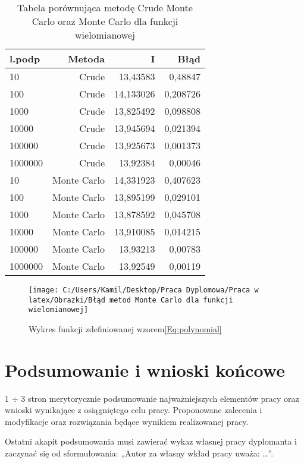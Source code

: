 \documentclass[12pt,twoside]{article}
\begin{document}
\begin{table}
\centering 
\caption{Tabela porównująca metodę Crude Monte Carlo oraz Monte Carlo dla funkcji wielomianowej}
\label{tabela9.7}
\begin{tabular}{lrrr}
\toprule
{l.podp} & Metoda &  I &  Błąd \\
\midrule
10  &     Crude & 13,43583  &   0,48847 \\
100  &     Crude & 14,133026 &   0,208726 \\
1000  &    Crude & 13,825492  &   0,098808  \\
10000  &    Crude & 13,945694  &   0,021394  \\
100000  &    Crude & 13,925673 &    0,001373   \\
1000000  &    Crude & 13,92384 &    0,00046   \\

10  &     Monte Carlo & 14,331923  &   0,407623 \\
100  &     Monte Carlo & 13,895199 &   0,029101\\
1000  &    Monte Carlo & 13,878592   &   0,045708  \\
10000  &    Monte Carlo & 13,910085  &   0,014215  \\
100000  &    Monte Carlo & 13,93213 &    0,00783   \\
1000000  &    Monte Carlo & 13,92549 &    0,00119   \\
\bottomrule
\end{tabular}
\end{table}

\begin{figure}
\texttt{[image: C:/Users/Kamil/Desktop/Praca Dyplomowa/Praca w latex/Obrazki/Błąd metod Monte Carlo dla funkcji wielomianowej]}
\caption{Wykres funkcji zdefiniowanej wzorem\eqref{Eq:polynomial}}
\end{figure}

\section{Podsumowanie i wnioski końcowe}

1 $\div$ 3 stron merytorycznie podsumowanie najważniejszych elementów pracy oraz wnioski wynikające z osiągniętego celu pracy. Proponowane zalecenia i modyfikacje oraz rozwiązania będące wynikiem realizowanej pracy.

Ostatni akapit podsumowania musi zawierać wykaz własnej pracy dyplomanta i zaczynać się od sformułowania: „Autor za własny wkład pracy uważa: \ldots”.
\end{document}
